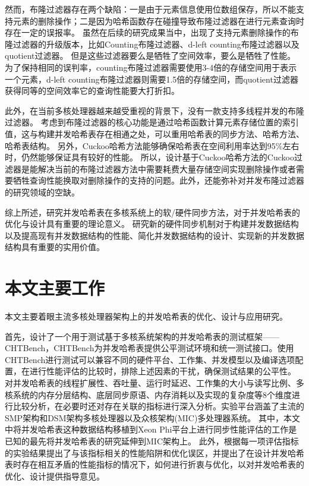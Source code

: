 然而，布隆过滤器存在两个缺陷：一是由于元素信息使用位数组保存，所以不能支持元素的删除操作；二是因为哈希函数存在碰撞导致布隆过滤器在进行元素查询时存在一定的误报率。
虽然在后续的研究成果当中，出现了支持元素删除操作的布隆过滤器的升级版本，比如Counting布隆过滤器\cite{fan2000summary}、d-left counting布隆过滤器\cite{bonomi2006improved}以及quotient过滤器\cite{bender2012don}。
但是这些过滤器要么是牺牲了空间效率，要么是牺牲了性能。
为了保持相同的误判率，counting布隆过滤器需要使用3-4倍的存储空间用于表示一个元素，d-left counting布隆过滤器则需要1.5倍的存储空间，而quotient过滤器获得同等的空间效率它的查询性能要大打折扣。

此外，在当前多核处理器越来越受重视的背景下，没有一款支持多线程并发的布隆过滤器。
考虑到布隆过滤器的核心功能是通过哈希函数计算元素存储位置的索引值，这与构建并发哈希表存在相通之处，可以重用哈希表的同步方法、哈希方法、哈希表结构。
另外，Cuckoo哈希方法能够确保哈希表在空间利用率达到95\%左右时，仍然能够保证具有较好的性能。
所以，设计基于Cuckoo哈希方法的Cuckoo过滤器是能解决当前的布隆过滤器方法中需要耗费大量存储空间实现删除操作或者需要牺牲查询性能换取对删除操作的支持的问题。此外，还能弥补对并发布隆过滤器的研究领域的空缺。

综上所述，研究并发哈希表在多核系统上的软/硬件同步方法，对于并发哈希表的优化与设计具有重要的理论意义。
研究新的硬件同步机制对于构建并发数据结构以及提高现有并发数据结构的性能、简化并发数据结构的设计、实现新的并发数据结构具有重要的实用价值。


\section{本文主要工作}
本文主要着眼主流多核处理器架构上的并发哈希表的优化、设计与应用研究。

首先，设计了一个用于测试基于多核系统架构的并发哈希表的测试框架——CHTBench，CHTBench为并发哈希表提供公平测试环境和统一测试接口。使用CHTBench进行测试可以兼容不同的硬件平台、工作集、并发模型以及编译选项配置，在进行性能评估的比较时，排除上述因素的干扰，确保测试结果的公平性。
对并发哈希表的线程扩展性、吞吐量、运行时延迟、工作集的大小与读写比例、多核系统的内存分层结构、底层同步原语、内存消耗以及实现的复杂度等8个维度进行比较分析，在必要时还对存在关联的指标进行深入分析。实验平台涵盖了主流的SMP架构和DSM架构多核处理器以及众核架构(MIC)多处理器系统。
其中，本文中将并发哈希表这种数据结构移植到Xeon Phi平台上进行同步性能评估的工作是已知的最先将并发哈希表的研究延伸到MIC架构上。
此外，根据每一项评估指标的实验结果提出了与该指标相关的性能陷阱和优化误区，并提出了在设计并发哈希表时存在相互矛盾的性能指标的情况下，如何进行折衷与优化，以对并发哈希表的优化、设计提供指导意见。

